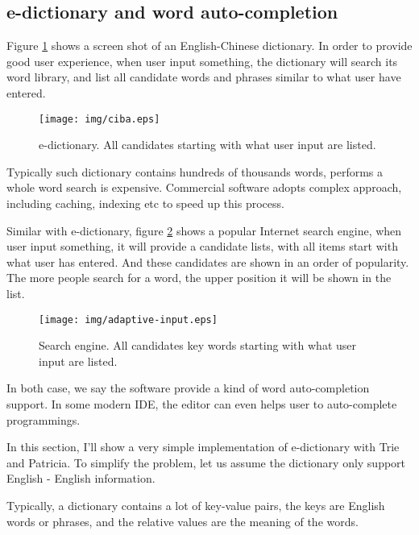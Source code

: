 \documentclass{article}
\begin{document}
\subsection{e-dictionary and word auto-completion}
Figure \ref{fig:e-dict} shows a screen shot of an English-Chinese dictionary.
In order to provide good user experience, when user input something,
the dictionary will search its word library, and list all candidate words and
phrases similar to what user have entered.

\begin{figure}[htbp]
       \begin{center}
	\texttt{[image: img/ciba.eps]}
        \caption{e-dictionary. All candidates starting with what user input are listed.}
        \label{fig:e-dict}
       \end{center}
\end{figure}

Typically such dictionary contains hundreds of thousands words, performs a whole
word search is expensive. Commercial software adopts complex approach, including
caching, indexing etc to speed up this process.

Similar with e-dictionary, figure \ref{fig:word-completion} shows a popular
Internet search engine, when user input something, it will provide a candidate
lists, with all items start with what user has entered. And these candidates
are shown in an order of popularity. The more people search for a word, the
upper position it will be shown in the list.

\begin{figure}[htbp]
       \begin{center}
	\texttt{[image: img/adaptive-input.eps]}
        \caption{Search engine. All candidates key words starting with what user input are listed.}
        \label{fig:word-completion}
       \end{center}
\end{figure}

In both case, we say the software provide a kind of word auto-completion support.
In some modern IDE, the editor can even helps user to auto-complete programmings.

In this section, I'll show a very simple implementation of e-dictionary with Trie
and Patricia.
To simplify the problem, let us assume the dictionary only support English - English
information.

Typically, a dictionary contains a lot of key-value pairs, the keys are English
words or phrases, and the relative values are the meaning of the words.
\end{document}
